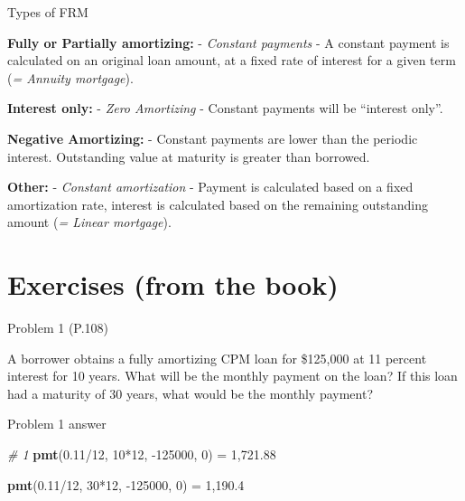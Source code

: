 \documentclass[ignorenonframetext,]{beamer}
\newenvironment{Shaded}{\begin{snugshade}}{\end{snugshade}}
\newcommand{\KeywordTok}[1]{\textcolor[rgb]{0.13,0.29,0.53}{\textbf{{#1}}}}
\newcommand{\DecValTok}[1]{\textcolor[rgb]{0.00,0.00,0.81}{{#1}}}
\newcommand{\FloatTok}[1]{\textcolor[rgb]{0.00,0.00,0.81}{{#1}}}
\newcommand{\StringTok}[1]{\textcolor[rgb]{0.31,0.60,0.02}{{#1}}}
\newcommand{\CommentTok}[1]{\textcolor[rgb]{0.56,0.35,0.01}{\textit{{#1}}}}
\newcommand{\NormalTok}[1]{{#1}}
\begin{document}
\begin{frame}{Types of FRM}

\textbf{Fully or Partially amortizing:} - \emph{Constant payments} - A
constant payment is calculated on an original loan amount, at a fixed
rate of interest for a given term (\emph{= Annuity mortgage}).

\textbf{Interest only:} - \emph{Zero Amortizing} - Constant payments
will be ``interest only''.

\textbf{Negative Amortizing:} - Constant payments are lower than the
periodic interest. Outstanding value at maturity is greater than
borrowed.

\textbf{Other:} - \emph{Constant amortization} - Payment is calculated
based on a fixed amortization rate, interest is calculated based on the
remaining outstanding amount (\emph{= Linear mortgage}).

\end{frame}

\section{Exercises (from the book)}\label{exercises-from-the-book}

\begin{frame}{Problem 1 (P.108)}

A borrower obtains a fully amortizing CPM loan for \$125,000 at 11
percent interest for 10 years. What will be the monthly payment on the
loan? If this loan had a maturity of 30 years, what would be the monthly
payment?

\end{frame}

\begin{frame}[fragile]{Problem 1 answer}

\begin{Shaded}
\begin{Highlighting}[]
\CommentTok{# 1}
\KeywordTok{pmt}\NormalTok{(}\FloatTok{0.11}\NormalTok{/}\DecValTok{12}\NormalTok{, }\DecValTok{10}\NormalTok{*}\DecValTok{12}\NormalTok{, -}\DecValTok{125000}\NormalTok{, }\DecValTok{0}\NormalTok{) =}\StringTok{ }
\DecValTok{1}\NormalTok{,}\FloatTok{721.88}

\KeywordTok{pmt}\NormalTok{(}\FloatTok{0.11}\NormalTok{/}\DecValTok{12}\NormalTok{, }\DecValTok{30}\NormalTok{*}\DecValTok{12}\NormalTok{, -}\DecValTok{125000}\NormalTok{, }\DecValTok{0}\NormalTok{) =}\StringTok{ }
\DecValTok{1}\NormalTok{,}\FloatTok{190.4}
\end{Highlighting}
\end{Shaded}

\end{frame}
\end{document}
